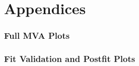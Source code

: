 \documentclass[UKenglish,texlive=2013]{\ATLASLATEXPATH atlasdoc}
\begin{document}
\clearpage
\newpage
\appendix
\part*{Appendices}

\section{Full MVA Plots}
\label{app:mvaplots}


\clearpage
\section{Fit Validation and  Postfit Plots}
\label{app:postfit}





%

\clearpage

\printbibliography
%
%
\end{document}
